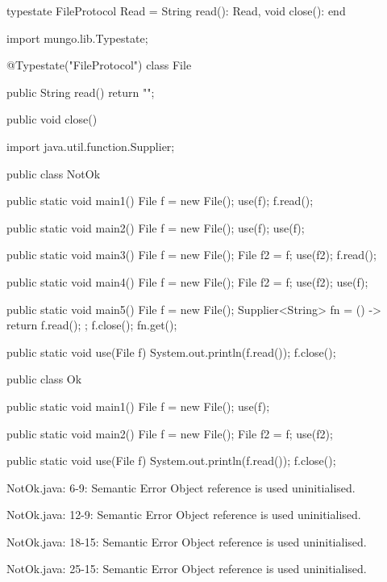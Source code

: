 \begin{code}
typestate FileProtocol {
  Read = {
    String read(): Read,
    void close(): end
  }
}\end{code}

\begin{code}
import mungo.lib.Typestate;

@Typestate("FileProtocol")
class File {

  public String read() {
    return "";
  }

  public void close() {
  }

}\end{code}

\begin{code}
import java.util.function.Supplier;

public class NotOk {
  public static void main1() {
    File f = new File();
    use(f);
    f.read();
  }

  public static void main2() {
    File f = new File();
    use(f);
    use(f);
  }

  public static void main3() {
    File f = new File();
    File f2 = f;
    use(f2);
    f.read();
  }

  public static void main4() {
    File f = new File();
    File f2 = f;
    use(f2);
    use(f);
  }

  public static void main5() {
    File f = new File();
    Supplier<String> fn = () -> {
      return f.read();
    };
    f.close();
    fn.get();
  }

  public static void use(File f) {
    System.out.println(f.read());
    f.close();
  }
}\end{code}

\begin{code}
public class Ok {
  public static void main1() {
    File f = new File();
    use(f);
  }

  public static void main2() {
    File f = new File();
    File f2 = f;
    use(f2);
  }

  public static void use(File f) {
    System.out.println(f.read());
    f.close();
  }
}\end{code}

\lstset{language=,caption=Original Mungo output}
\begin{code}

NotOk.java: 6-9: Semantic Error
		Object reference is used uninitialised.

NotOk.java: 12-9: Semantic Error
		Object reference is used uninitialised.

NotOk.java: 18-15: Semantic Error
		Object reference is used uninitialised.

NotOk.java: 25-15: Semantic Error
		Object reference is used uninitialised.
\end{code}

